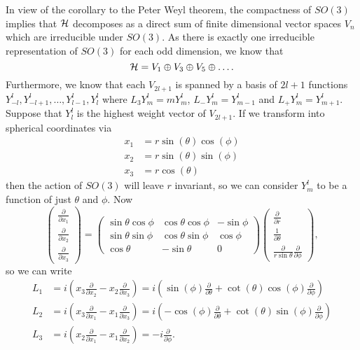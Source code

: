 \documentclass[a4paper]{article}
\begin{document}
In view of the corollary to the Peter Weyl theorem, the compactness of $SO(3)$ implies that $\mathcal{H}$ decomposes as a direct sum of finite dimensional vector spaces $V_n$ which are irreducible under $SO(3)$. As there is exactly one irreducible representation of $SO(3)$ for each odd dimension, we know that 
$$\mathcal{H} = V_1 \oplus V_3 \oplus V_5 \oplus \hdots.$$
Furthermore, we know that each $V_{2l+1}$ is spanned by a basis of $2l+1$ functions $Y^l_{-l}, Y^l_{-l + 1}, \hdots, Y^l_{l-1}, Y^l_{l}$ where $L_3 Y^l_{m} = m Y^l_{m}$, $L_{-} Y^l_{m} = Y^l_{m-1}$ and $L_{+} Y^l_{m} = Y^l_{m+1}$. 
Suppose that $Y^l_{l}$ is the highest weight vector of $V_{2l+1}$. If we transform into spherical coordinates via
\begin{align*}
    x_1&=r\sin(\theta)\cos(\phi)\\
    x_2&=r\sin(\theta)\sin(\phi)\\
    x_3&=r\cos(\theta)
\end{align*}
then the action of $SO(3)$ will leave $r$ invariant, so we can consider $Y^l_{m}$ to be a function of just $\theta$ and $\phi$. Now 
$$\left(
    \begin{array}{c}
    \frac{\partial}{\partial x_{1}} \\
    \frac{\partial}{\partial x_{2}} \\
    \frac{\partial}{\partial x_{3}}
    \end{array}\right)=\left(\begin{array}{ccc}
    \sin \theta \cos \phi & \cos \theta \cos \phi & -\sin \phi \\
    \sin \theta \sin \phi & \cos \theta \sin \phi & \cos \phi \\
    \cos \theta & -\sin \theta & 0
    \end{array}\right)\left(\begin{array}{c}
    \frac{\partial}{\partial r} \\
    \frac{1}{\partial \theta} \\
    \frac{\partial}{r \sin \theta} \frac{\partial}{\partial \phi}
    \end{array}
\right),$$
so we can write 
\begin{align*}
    L_1 &= i\left(x_3\frac{\partial}{\partial x_2} - x_2\frac{\partial}{\partial x_3}\right) = i\left(\sin(\phi)\frac{\partial}{\partial \theta} + \cot(\theta)\cos(\phi)\frac{\partial}{\partial \phi}\right)\\
    L_2 &= i\left(x_3\frac{\partial}{\partial x_1} - x_1\frac{\partial}{\partial x_3}\right) = i\left(-\cos(\phi)\frac{\partial}{\partial \theta} + \cot(\theta)\sin(\phi)\frac{\partial}{\partial \phi}\right)\\
    L_3 &= i\left(x_2\frac{\partial}{\partial x_1} - x_1\frac{\partial}{\partial x_2}\right) = -i \frac{\partial}{\partial \phi}.
\end{align*}
\end{document}
